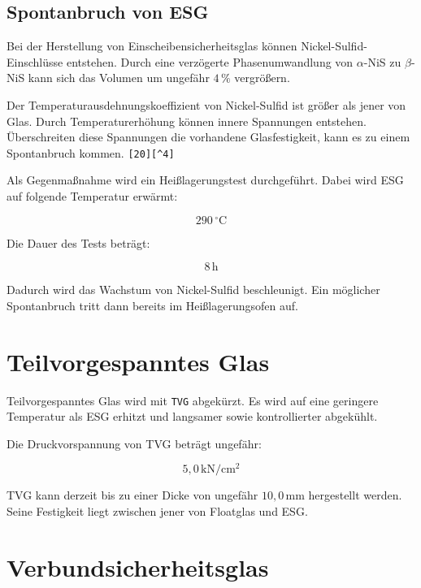 \documentclass[
  12pt,
  a4paper,
  oneside
]{scrreprt}
\newcommand{\quelle}[1]{\hfill\texttt{#1}}
\begin{document}
\subsection{Spontanbruch von ESG}

Bei der Herstellung von Einscheibensicherheitsglas können
Nickel-Sulfid-Einschlüsse entstehen. Durch eine verzögerte
Phasenumwandlung von $\alpha$-NiS zu $\beta$-NiS kann sich das
Volumen um ungefähr $4\,\%$ vergrößern. 

Der Temperaturausdehnungskoeffizient von Nickel-Sulfid ist größer als
jener von Glas. Durch Temperaturerhöhung können innere Spannungen
entstehen. Überschreiten diese Spannungen die vorhandene Glasfestigkeit,
kann es zu einem Spontanbruch kommen. \quelle{[20][^4]}

Als Gegenmaßnahme wird ein Heißlagerungstest durchgeführt. Dabei wird
ESG auf folgende Temperatur erwärmt:

\begin{equation}
  290\,^\circ\mathrm{C}
\end{equation}

Die Dauer des Tests beträgt:

\begin{equation}
  8\,\mathrm{h}
\end{equation}

Dadurch wird das Wachstum von Nickel-Sulfid beschleunigt. Ein möglicher
Spontanbruch tritt dann bereits im Heißlagerungsofen auf.


\section{Teilvorgespanntes Glas}

Teilvorgespanntes Glas wird mit \texttt{TVG} abgekürzt. Es wird auf eine
geringere Temperatur als ESG erhitzt und langsamer sowie kontrollierter
abgekühlt. 

Die Druckvorspannung von TVG beträgt ungefähr:

\begin{equation}
  5{,}0\,\mathrm{kN/cm^2}
\end{equation}

TVG kann derzeit bis zu einer Dicke von ungefähr
$10{,}0\,\mathrm{mm}$ hergestellt werden. Seine Festigkeit liegt
zwischen jener von Floatglas und ESG. 

\section{Verbundsicherheitsglas}
\end{document}
